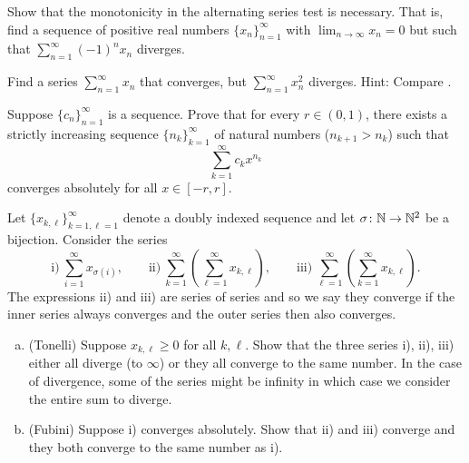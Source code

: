 \begin{exercise}[Challenging]
Show that the monotonicity in the alternating series test
is necessary.  That is, find a sequence of positive real numbers
$\{ x_n \}_{n=1}^\infty$ with $\lim_{n\to\infty} x_n = 0$ but such that
$\sum_{n=1}^\infty {(-1)}^n x_n$ diverges.
\end{exercise}

\begin{exercise}
Find a series
$\sum_{n=1}^\infty x_n$ that converges,
but $\sum_{n=1}^\infty x_n^2$ diverges.
Hint: Compare .
\end{exercise}

\begin{exercise}
Suppose $\{ c_n \}_{n=1}^\infty$ is a sequence.  Prove that for every $r \in (0,1)$,
there exists a strictly increasing sequence $\{ n_k \}_{k=1}^\infty$ of natural numbers
($n_{k+1} > n_k$) such that
\begin{equation*}
\sum_{k=1}^\infty c_k x^{n_k}
\end{equation*}
converges absolutely for all $x \in [-r,r]$.
\end{exercise}

\begin{exercise}
\label{exercise:tonellifubiniforsums}%
%
Let $\{ x_{k,\ell} \}_{k=1,\ell=1}^\infty$ denote a doubly
indexed sequence and let $\sigma \colon {\mathbb{N}} \to {\mathbb{N}}^2$ be a bijection.
Consider the series
\begin{equation*}
\text{i)}~\sum_{i=1}^\infty x_{\sigma(i)},
\qquad
\text{ii)}~\sum_{k=1}^\infty \left( \sum_{\ell=1}^\infty x_{k,\ell} \right),
\qquad
\text{iii)}~\sum_{\ell=1}^\infty \left( \sum_{k=1}^\infty x_{k,\ell} \right) .
\end{equation*}
The expressions ii) and iii) are series of series and so we say they converge
if the inner series always converges and the outer series then also
converges.
\begin{enumerate}[a)]
\item
(Tonelli) Suppose $x_{k,\ell} \geq 0$ for all $k,\ell$.
Show that the three series i), ii), iii) either all diverge (to $\infty$)
or they all converge to the same number.
In the case of divergence, some of the  series might be infinity
in which case we consider the entire sum to diverge.
\item
(Fubini) Suppose i) converges absolutely.  Show that ii) and iii)
converge and they both converge to the same number as i).
\end{enumerate}
\end{exercise}

